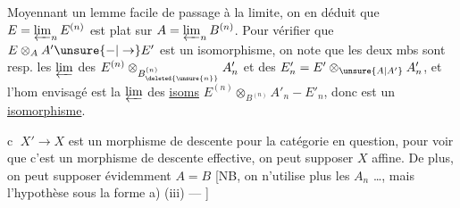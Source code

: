 Moyennant un lemme facile de passage à la limite,
on en déduit que $E=\varprojlim_n E^{(n)}$ est plat sur
$A=\varprojlim_n B^{(n)}$. Pour vérifier  que $E\otimes_A A'\unsure{-|\to} E'$ est
un isomorphisme, on note que les deux mbs sont
resp. les $\varprojlim$ des $E^{(n)}\otimes_{B^{(n)}_{\deleted{\unsure{n}}}} A'_n$ et des $E'_n=E'\otimes_{\unsure{A|A'}} A'_n$,
et l'hom envisagé est la $\varprojlim$ des \uline{isoms}
$E^{(n)}\otimes_{B^{(n)}} A'_n-E'_n$, donc est un \uline{isomorphisme}.

\textcircled{c}  $X'\to X$ est un morphisme de
descente pour la catégorie en question, pour voir que
c'est un morphisme de descente effective, on peut
supposer $X$ affine. De plus, on peut supposer
évidemment $A=B$ [NB, on n'utilise plus les $A_n$ \ldots, mais
l'hypothèse sous la forme
a) (iii) --- ]

